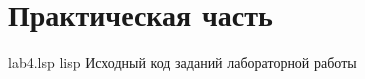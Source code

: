 \chapter*{Практическая часть}

	{lab4.lsp} %
	{lisp} %
	{Исходный код заданий лабораторной работы} %